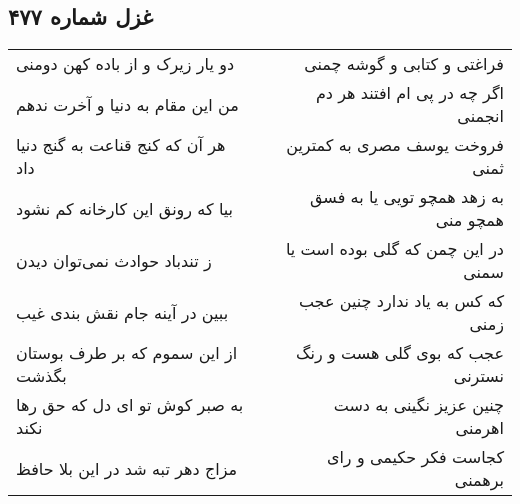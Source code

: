\begin{center}
\section*{غزل شماره ۴۷۷}
\label{sec:sh477}
\begin{longtable}{l p{0.5cm} r}
دو یار زیرک و از باده کهن دومنی
&&
فراغتی و کتابی و گوشه چمنی
\\
من این مقام به دنیا و آخرت ندهم
&&
اگر چه در پی ام افتند هر دم انجمنی
\\
هر آن که کنج قناعت به گنج دنیا داد
&&
فروخت یوسف مصری به کمترین ثمنی
\\
بیا که رونق این کارخانه کم نشود
&&
به زهد همچو تویی یا به فسق همچو منی
\\
ز تندباد حوادث نمی‌توان دیدن
&&
در این چمن که گلی بوده است یا سمنی
\\
ببین در آینه جام نقش بندی غیب
&&
که کس به یاد ندارد چنین عجب زمنی
\\
از این سموم که بر طرف بوستان بگذشت
&&
عجب که بوی گلی هست و رنگ نسترنی
\\
به صبر کوش تو ای دل که حق رها نکند
&&
چنین عزیز نگینی به دست اهرمنی
\\
مزاج دهر تبه شد در این بلا حافظ
&&
کجاست فکر حکیمی و رای برهمنی
\\
\end{longtable}
\end{center}
